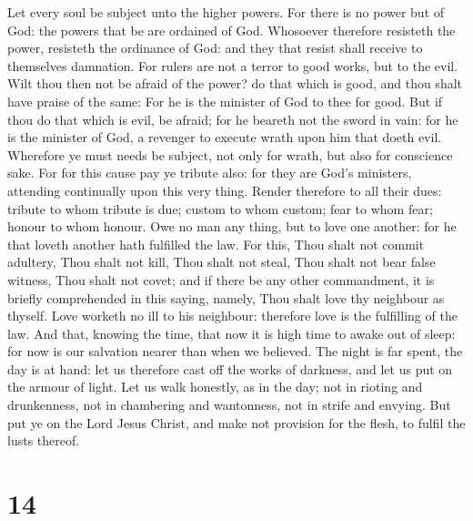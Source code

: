  Let every soul be subject unto the higher powers. For
there is no power but of God: the powers that be are ordained of God.
 Whosoever therefore resisteth the power, resisteth the
ordinance of God: and they that resist shall receive to themselves
damnation.  For rulers are not a terror to good works, but
to the evil. Wilt thou then not be afraid of the power? do that which is
good, and thou shalt have praise of the same:  For he is
the minister of God to thee for good. But if thou do that which is evil,
be afraid; for he beareth not the sword in vain: for he is the minister
of God, a revenger to execute wrath upon him that doeth evil.
 Wherefore ye must needs be subject, not only for wrath,
but also for conscience sake.  For for this cause pay ye
tribute also: for they are God's ministers, attending continually upon
this very thing.  Render therefore to all their dues:
tribute to whom tribute is due; custom to whom custom; fear to whom
fear; honour to whom honour.  Owe no man any thing, but to
love one another: for he that loveth another hath fulfilled the law.
 For this, Thou shalt not commit adultery, Thou shalt not
kill, Thou shalt not steal, Thou shalt not bear false witness, Thou
shalt not covet; and if there be any other commandment, it is briefly
comprehended in this saying, namely, Thou shalt love thy neighbour as
thyself.  Love worketh no ill to his neighbour: therefore
love is the fulfilling of the law.  And that, knowing the
time, that now it is high time to awake out of sleep: for now is our
salvation nearer than when we believed.  The night is far
spent, the day is at hand: let us therefore cast off the works of
darkness, and let us put on the armour of light.  Let us
walk honestly, as in the day; not in rioting and drunkenness, not in
chambering and wantonness, not in strife and envying. 
But put ye on the Lord Jesus Christ, and make not provision for the
flesh, to fulfil the lusts thereof.

\hypertarget{section-13}{%
\section{14}\label{section-13}}


